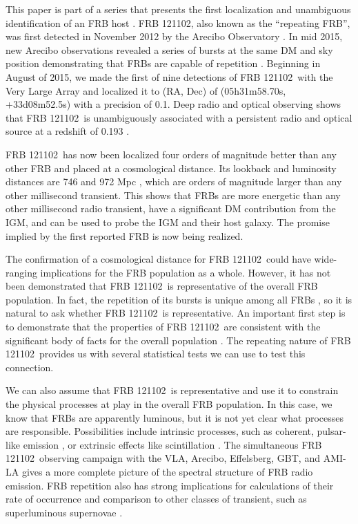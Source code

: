 \documentclass[twocolumn]{aastex61}
\newcommand{\frb}{FRB 121102}
\begin{document}
This paper is part of a series that presents the first localization and unambiguous identification of an FRB host \citep{LOC, OPT, EVN}. \frb, also known as the ``repeating FRB'', was first detected in November 2012 by the Arecibo Observatory \citep{2014ApJ...790..101S}. In mid 2015, new Arecibo observations revealed a series of bursts at the same DM and sky position demonstrating that FRBs are capable of repetition \citep{2016Natur.531..202S}. Beginning in August of 2015, we made the first of nine detections of \frb\ with the Very Large Array \citep{LOC} and localized it to (RA, Dec) of (05h31m58.70s, +33d08m52.5s) with a precision of 0.1\arcsec. Deep radio and optical observing shows that \frb\ is unambiguously associated with a persistent radio and optical source at a redshift of 0.193 \citep{OPT, EVN}.

\frb\ has now been localized four orders of magnitude better than any other FRB and placed at a cosmological distance. Its lookback and luminosity distances are 746 and 972 Mpc \citep{2016A&A...594A..13P}, which are orders of magnitude larger than any other millisecond transient. This shows that FRBs are more energetic than any other millisecond radio transient, have a significant DM contribution from the IGM, and can be used to probe the IGM and their host galaxy. The promise implied by the first reported FRB \citep{2007Sci...318..777L} is now being realized.

The confirmation of a cosmological distance for \frb\ could have wide-ranging implications for the FRB population as a whole. However, it has not been demonstrated that \frb\ is representative of the overall FRB population. In fact, the repetition of its bursts is unique among all FRBs \citep{2015MNRAS.454..457P}, so it is natural to ask whether \frb\ is representative. An important first step is to demonstrate that the properties of \frb\ are consistent with the significant body of facts for the overall population \citep{2015MNRAS.451.3278M, 2016MPLA...3130013K}. The repeating nature of \frb\ provides us with several statistical tests we can use to test this connection.

We can also assume that \frb\ is representative and use it to constrain the physical processes at play in the overall FRB population. In this case, we know that FRBs are apparently luminous, but it is not yet clear what processes are responsible. Possibilities include intrinsic processes, such as coherent, pulsar-like emission \citep{2014PhRvD..89j3009K, 2014ApJ...785L..26L, 2016MNRAS.457..232C}, or extrinsic effects like scintillation \citep{CORDES}. The simultaneous \frb\ observing campaign with the VLA, Arecibo, Effelsberg, GBT, and AMI-LA gives a more complete picture of the spectral structure of FRB radio emission. FRB repetition also has strong implications for calculations of their rate of occurrence \citep{2016MNRAS.458L..89C} and comparison to other classes of transient, such as superluminous supernovae \citep{OPT}.
\end{document}
